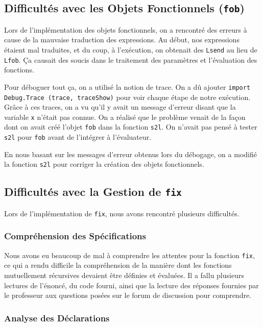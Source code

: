 \documentclass[a4paper,12pt]{article}
\begin{document}
\subsection{Difficultés avec les Objets Fonctionnels (\texttt{fob})}

Lors de l'implémentation des objets fonctionnels, on a rencontré des erreurs à cause de la mauvaise traduction des expressions. Au début, nos expressions étaient mal traduites, et du coup, à l'exécution, on obtenait des \texttt{Lsend} au lieu de \texttt{Lfob}. Ça causait des soucis dans le traitement des paramètres et l'évaluation des fonctions.

Pour déboguer tout ça, on a utilisé la notion de trace. On a dû ajouter \texttt{import Debug.Trace (trace, traceShow)} pour voir chaque étape de notre exécution. Grâce à ces traces, on a vu qu'il y avait un message d'erreur disant que la variable \texttt{x} n'était pas connue. On a réalisé que le problème venait de la façon dont on avait créé l'objet \texttt{fob} dans la fonction \texttt{s2l}. On n'avait pas pensé à tester \texttt{s2l} pour \texttt{fob} avant de l'intégrer à l'évaluateur.

En nous basant sur les messages d'erreur obtenus lors du débogage, on a modifié la fonction \texttt{s2l} pour corriger la création des objets fonctionnels.

\subsection{Difficultés avec la Gestion de \texttt{fix}}

Lors de l'implémentation de \texttt{fix}, nous avons rencontré plusieurs difficultés.

\subsubsection{Compréhension des Spécifications}

Nous avons eu beaucoup de mal à comprendre les attentes pour la fonction \texttt{fix}, ce qui a rendu difficile la compréhension de la manière dont les fonctions mutuellement récursives devaient être définies et évaluées. Il a fallu plusieurs lectures de l'énoncé, du code fourni, ainsi que la lecture des réponses fournies par le professeur aux questions posées sur le forum de discussion pour comprendre.

\subsubsection{Analyse des Déclarations}
\end{document}
